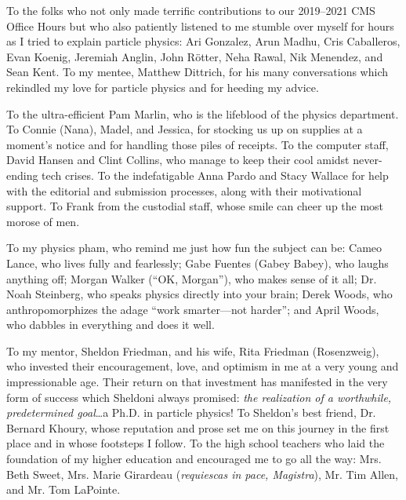 To the folks who not only made terrific contributions to our 2019--2021 CMS Office Hours but who also patiently listened to me stumble over myself for hours as I tried to explain particle physics:
Ari Gonzalez, Arun Madhu, Cris Caballeros, Evan Koenig, Jeremiah Anglin, John Rötter, Neha Rawal, Nik Menendez, and Sean Kent.
To my mentee, Matthew Dittrich, for his many conversations which rekindled my love for particle physics and for heeding my advice.

To the ultra-efficient Pam Marlin, who is the lifeblood of the physics department.
To Connie (Nana), Madel, and Jessica, for stocking us up on supplies at a moment's notice and for handling those piles of receipts.
To the computer staff, David Hansen and Clint Collins, who manage to keep their cool amidst never-ending tech crises.
To the indefatigable Anna Pardo and Stacy Wallace for help with the editorial and submission processes, along with their motivational support.
To Frank from the custodial staff, whose smile can cheer up the most morose of men.

To my physics pham, who remind me just how fun the subject can be:
Cameo Lance, who lives fully and fearlessly;
Gabe Fuentes (Gabey Babey), who laughs anything off;
Morgan Walker (``OK, Morgan''), who makes sense of it all;
Dr. Noah Steinberg, who speaks physics directly into your brain;
Derek Woods, who anthropomorphizes the adage ``work smarter---not harder'';
and April Woods, who dabbles in everything and does it well.

To my mentor, Sheldon Friedman, and his wife, Rita Friedman (Rosenzweig), who invested their encouragement, love, and optimism in me at a very young and impressionable age.
Their return on that investment has manifested in the very form of success which Sheldoni always promised: \emph{the realization of a worthwhile, predetermined goal}\ldots a Ph.D. in particle physics!
To Sheldon's best friend, Dr. Bernard Khoury, whose reputation and prose set me on this journey in the first place and in whose footsteps I follow.
To the high school teachers who laid the foundation of my higher education and encouraged me to go all the way: Mrs. Beth Sweet, Mrs. Marie Girardeau (\emph{requiescas in pace, Magistra}),  Mr. Tim Allen, and Mr. Tom LaPointe.

